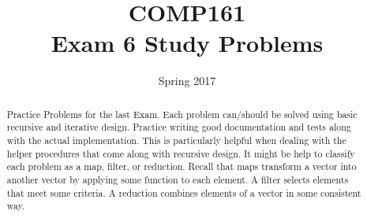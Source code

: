 \documentclass[nobib]{tufte-handout}
\title{COMP161 \\ Exam 6 Study Problems}
\author{}
\date{Spring 2017}
\begin{document}
\maketitle

\begin{abstract}
  Practice Problems for the last Exam. Each problem can/should be solved using basic recursive and iterative design.  Practice writing good documentation and tests along with the actual implementation. This is particularly helpful when dealing with the helper procedures that come along with recursive design. It might be help to classify each problem as a map, filter, or reduction. Recall that maps transform a vector into another vector by applying some function to each element. A filter selects elements that meet some criteria. A reduction combines elements of a vector in some consistent way.
\end{abstract}
\end{document}

